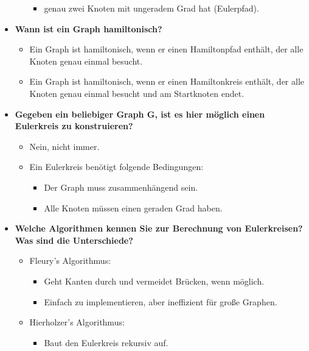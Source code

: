 \documentclass[12pt]{scrartcl}
\begin{document}
\begin{itemize}
\begin{itemize}
\begin{itemize}
                        \item genau zwei Knoten mit ungeradem Grad hat (Eulerpfad).
                    \end{itemize}
          \end{itemize}
    \item \textbf{Wann ist ein Graph hamiltonisch?}
          \begin{itemize}
              \item Ein Graph ist hamiltonisch, wenn er einen Hamiltonpfad enthält, der alle Knoten genau einmal besucht.
              \item Ein Graph ist hamiltonisch, wenn er einen Hamiltonkreis enthält, der alle Knoten genau einmal besucht und am Startknoten endet.
          \end{itemize}
    \item \textbf{Gegeben ein beliebiger Graph G, ist es hier möglich einen Eulerkreis zu konstruieren?}
          \begin{itemize}
              \item Nein, nicht immer.
              \item Ein Eulerkreis benötigt folgende Bedingungen:
                    \begin{itemize}
                        \item Der Graph muss zusammenhängend sein.
                        \item Alle Knoten müssen einen geraden Grad haben.
                    \end{itemize}
          \end{itemize}
    \item \textbf{Welche Algorithmen kennen Sie zur Berechnung von Eulerkreisen? Was sind die Unterschiede?}
          \begin{itemize}
              \item Fleury's Algorithmus:
                    \begin{itemize}
                        \item Geht Kanten durch und vermeidet Brücken, wenn möglich.
                        \item Einfach zu implementieren, aber ineffizient für große Graphen.
                    \end{itemize}
              \item Hierholzer's Algorithmus:
                    \begin{itemize}
                        \item Baut den Eulerkreis rekursiv auf.

\end{itemize}
\end{itemize}
\end{itemize}
\end{document}
